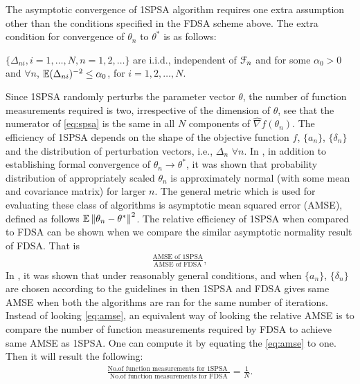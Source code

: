 The asymptotic convergence of 1SPSA algorithm requires one extra assumption other than the conditions specified in the FDSA scheme above. The extra condition for convergence of $\theta_n$ to $\theta^*$  is as follows:
\begin{pvn}
\item $\{\Delta_{ni}, i=1,\ldots,N, n=1,2,\ldots\}$ are i.i.d., independent of $\mathcal{F}_n$ and for some $\alpha_0 > 0$ and $\forall n$, $\mathbb{E} (\Delta_{ni})^{-2} \le \alpha_0$, for $i = 1,2,\ldots,N$.
\end{pvn}
Since 1SPSA randomly perturbs the parameter vector $\theta$, the number of function measurements required is two, irrespective of the dimension of $\theta$, see that the numerator of \eqref{eq:spsa} is the same in all $N$ components of $\widehat{\nabla} f(\theta_{n})$. The efficiency of 1SPSA depends on the shape of the objective function $f$, $\{a_n\}$, $\{\delta_n\}$ and the distribution of perturbation vectors, i.e., $\Delta_n$ $\forall n$. In \cite{spall}, in addition to establishing formal convergence of $\theta_n \to \theta^*$, it was shown that probability distribution of appropriately scaled $\theta_n$ is approximately normal  (with some mean and covariance matrix) for larger $n$. The general metric which is used for evaluating these class of algorithms is asymptotic mean squared error (AMSE), defined as follows  $\mathbb{E}\left\| \theta_{n} - \theta^* \right\|^2$.  The relative efficiency of 1SPSA when compared to FDSA can be shown when we compare the similar asymptotic normality result of FDSA. That is
\begin{align}\label{eq:amse}
\frac{\text{AMSE of 1SPSA}}{\text{AMSE of FDSA}},
\end{align}
In \cite{spall}, it was shown that under reasonably general conditions, and when $\{a_n\}$, $\{\delta_n\}$ are chosen according to the guidelines in \cite{spall1998implementation} then 1SPSA and FDSA gives same AMSE when both the algorithms are ran for the same number of iterations. 
Instead of looking \eqref{eq:amse}, an equivalent way of looking the relative AMSE is to compare the number of function measurements required by FDSA to achieve same AMSE as 1SPSA. One can compute it  by equating the \eqref{eq:amse} to one. Then it will result the following:
\begin{align}\label{eq:amsenom}
 \frac{\text{No.of function measurements for 1SPSA }}{\text{No.of function measurements for FDSA}}=  \frac{1}{N}.
\end{align}

